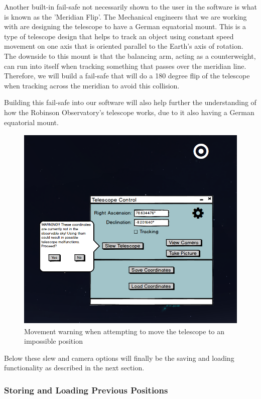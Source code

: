 \documentclass[12pt]{report}
\begin{document}
Another built-in fail-safe not necessarily shown to the user in the software is what is known as the 'Meridian Flip'. The Mechanical engineers that we are working with are designing the telescope to have a German equatorial mount. This is a type of telescope design that helps to track an object using constant speed movement on one axis that is oriented parallel to the Earth's axis of rotation. The downside to this mount is that the balancing arm, acting as a counterweight, can run into itself when tracking something that passes over the meridian line. Therefore, we will build a fail-safe that will do a 180 degree flip of the telescope when tracking across the meridian to avoid this collision.

Building this fail-safe into our software will also help further the understanding of how the Robinson Observatory's telescope works, due to it also having a German equatorial mount.

\newpage

\begin{figure}[h]
	\centering
	\includegraphics[width=0.80\linewidth, height=10cm]{MainScreenSlewWarning}
	\caption{Movement warning when attempting to move the telescope to an impossible position}
\end{figure}

Below these slew and camera options will finally be the saving and loading functionality as described in the next section.



\subsubsection*{Storing and Loading Previous Positions}
\end{document}
